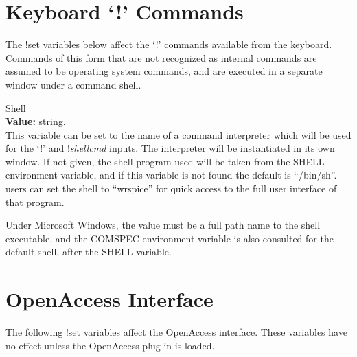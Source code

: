 \section{Keyboard `!' Commands}

The {\cb !set} variables below affect the `!' commands available from
the keyboard.  Commands of this form that are not recognized as
internal commands are assumed to be operating system commands, and are
executed in a separate window under a command shell.

\begin{description}
\item{\et Shell}\\
{\bf Value:} string.\\
This variable can be set to the name of a command interpreter which
will be used for the `!' and !{\it shellcmd} inputs.  The interpreter
will be instantiated in its own window.  If not given, the shell
program used will be taken from the {\et SHELL} environment variable,
and if this variable is not found the default is ``{\vt /bin/sh}''. 
{\WRspice} users can set the shell to ``{\vt wrspice}'' for quick
access to the full user interface of that program.

Under Microsoft Windows, the value must be a full path name to the
shell executable, and the {\et COMSPEC} environment variable is also
consulted for the default shell, after the {\et SHELL} variable.
\end{description}


\section{OpenAccess Interface}

The following {\cb !set} variables affect the OpenAccess interface. 
These variables have no effect unless the OpenAccess plug-in is
loaded.

